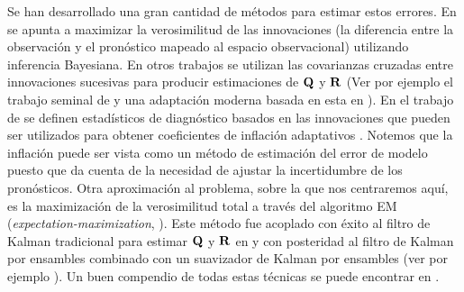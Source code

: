 Se han desarrollado una gran cantidad de métodos para estimar estos errores. En \cite{Stroud2018} se apunta a maximizar la verosimilitud de las innovaciones (la diferencia entre la observación y el pronóstico mapeado al espacio observacional) utilizando inferencia Bayesiana. En otros trabajos se utilizan las covarianzas cruzadas entre innovaciones sucesivas para producir estimaciones de $\mathbf{Q}$ y $\mathbf{R}$ (Ver por ejemplo el trabajo seminal de \cite{Mehra1970} y una adaptación moderna basada en esta en \cite{Berry2013}). En el trabajo de \cite{Desroziers2005} se definen estadísticos de diagnóstico basados en las innovaciones que pueden ser utilizados para obtener coeficientes de inflación adaptativos \citep{Li2009}. Notemos que la inflación puede ser vista como un método de estimación del error de modelo puesto que da cuenta de la necesidad de ajustar la incertidumbre de los pronósticos. Otra aproximación al problema, sobre la que nos centraremos aquí, es la maximización de la verosimilitud total a través del algoritmo EM (\textit{expectation-maximization}, \cite{Dempster1977}). Este método fue acoplado con éxito al filtro de Kalman tradicional para estimar $\mathbf{Q}$ y $\mathbf{R}$ en \cite{Shumway1982} y con posteridad al filtro de Kalman por ensambles combinado con un suavizador de Kalman por ensambles (ver por ejemplo \cite{Dreano2017}). Un buen compendio de todas estas técnicas se puede encontrar en \cite{Tandeo2020}.

